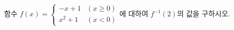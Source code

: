 \hspace*{2mm}\begin{minipage}[t]{\dimexpr\linewidth-2mm\relax}\vspace{0pt}
함수 $f(x)=\begin{cases} -x+1 & (x\ge 0) \\ x^2+1 & (x<0) \end{cases}$에 대하여 $f^{-1}(2)$의 값을 구하시오.\end{minipage}
